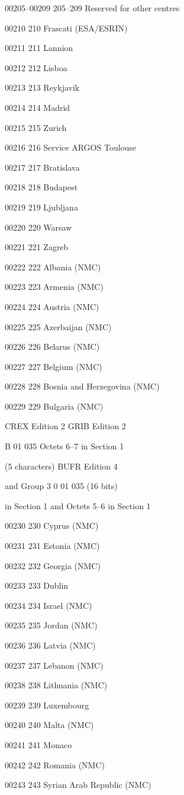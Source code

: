 00205--00209 205--209 Reserved for other centres

00210 210 Frascati (ESA/ESRIN)

00211 211 Lannion

00212 212 Lisboa

00213 213 Reykjavik

00214 214 Madrid

00215 215 Zurich

00216 216 Service ARGOS Toulouse

00217 217 Bratislava

00218 218 Budapest

00219 219 Ljubljana

00220 220 Warsaw

00221 221 Zagreb

00222 222 Albania (NMC)

00223 223 Armenia (NMC)

00224 224 Austria (NMC)

00225 225 Azerbaijan (NMC)

00226 226 Belarus (NMC)

00227 227 Belgium (NMC)

00228 228 Bosnia and Herzegovina (NMC)

00229 229 Bulgaria (NMC)

CREX Edition 2 GRIB Edition 2

B 01 035 Octets 6--7 in Section 1

(5 characters) BUFR Edition 4

and Group 3 0 01 035 (16 bits)

in Section 1 and Octets 5--6 in Section 1

00230 230 Cyprus (NMC)

00231 231 Estonia (NMC)

00232 232 Georgia (NMC)

00233 233 Dublin

00234 234 Israel (NMC)

00235 235 Jordan (NMC)

00236 236 Latvia (NMC)

00237 237 Lebanon (NMC)

00238 238 Lithuania (NMC)

00239 239 Luxembourg

00240 240 Malta (NMC)

00241 241 Monaco

00242 242 Romania (NMC)

00243 243 Syrian Arab Republic (NMC)

